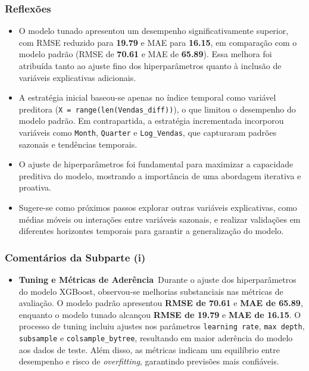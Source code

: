 \documentclass[a4paper, 12pt]{article}
\begin{document}
\subsubsection{Reflexões} 

\begin{itemize} 
    \item O modelo tunado apresentou um desempenho significativamente superior, com RMSE reduzido para \textbf{19.79} e MAE para \textbf{16.15}, em comparação com o modelo padrão (RMSE de \textbf{70.61} e MAE de \textbf{65.89}). Essa melhora foi atribuída tanto ao ajuste fino dos hiperparâmetros quanto à inclusão de variáveis explicativas adicionais. 
    \item A estratégia inicial baseou-se apenas no índice temporal como variável preditora (\texttt{X = range(len(Vendas\_diff))}), o que limitou o desempenho do modelo padrão. Em contrapartida, a estratégia incrementada incorporou variáveis como \texttt{Month}, \texttt{Quarter} e \texttt{Log\_Vendas}, que capturaram padrões sazonais e tendências temporais. 
    \item O ajuste de hiperparâmetros foi fundamental para maximizar a capacidade preditiva do modelo, mostrando a importância de uma abordagem iterativa e proativa. 
    \item Sugere-se como próximos passos explorar outras variáveis explicativas, como médias móveis ou interações entre variáveis sazonais, e realizar validações em diferentes horizontes temporais para garantir a generalização do modelo. 
\end{itemize}



\subsubsection{Comentários da Subparte (i)}

\begin{itemize} \item \textbf{Tuning e Métricas de Aderência}\ Durante o ajuste dos hiperparâmetros do modelo XGBoost, observou-se melhorias substanciais nas métricas de avaliação. O modelo padrão apresentou \textbf{RMSE de 70.61} e \textbf{MAE de 65.89}, enquanto o modelo tunado alcançou \textbf{RMSE de 19.79} e \textbf{MAE de 16.15}. O processo de tuning incluiu ajustes nos parâmetros \texttt{learning rate}, \texttt{max depth}, \texttt{subsample} e \texttt{colsample\_bytree}, resultando em maior aderência do modelo aos dados de teste. Além disso, as métricas indicam um equilíbrio entre desempenho e risco de \textit{overfitting}, garantindo previsões mais confiáveis. \end{itemize}
\end{document}
